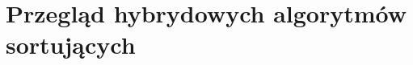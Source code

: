 \chapter{Przegląd hybrydowych algorytmów sortujących}
\thispagestyle{chapterBeginStyle}














